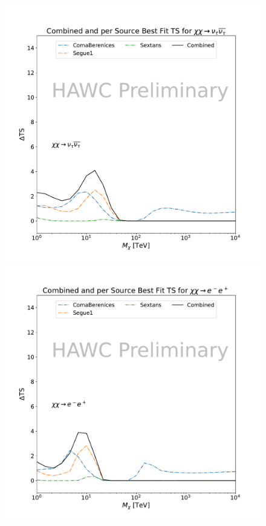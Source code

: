 \begin{figure}[h]
{    \includegraphics[scale=0.21]{figures/mtd_hawc_dm/results/CombinedTS_New_duck_nutaunutau_.pdf}
    \includegraphics[scale=0.21]{figures/mtd_hawc_dm/results/CombinedTS_New_duck_ee_.pdf}
}
\end{figure}
